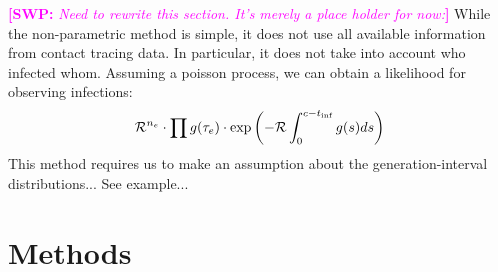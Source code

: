 \documentclass{article}
\newcommand{\RR}{\ensuremath{{\mathcal R}}}
\newcommand{\comment}[3]{\textcolor{#1}{\textbf{[#2: }\textsl{#3}\textbf{]}}}
\newcommand{\swp}[1]{\comment{magenta}{SWP}{#1}}
\begin{document}
\swp{Need to rewrite this section. It's merely a place holder for now:}
While the non-parametric method is simple, it does not use all available information from contact tracing data.
In particular, it does not take into account who infected whom.
Assuming a poisson process, we can obtain a likelihood for observing infections:
\begin{equation}
\RR^{n_e} \cdot \prod g(\tau_e) \cdot \exp \left(- \RR \int_0^{c - t_{\tiny\textrm{inf}}} g(s) ds \right)
\end{equation}
This method requires us to make an assumption about the generation-interval distributions... See example...




\section{Methods}




\end{document}
